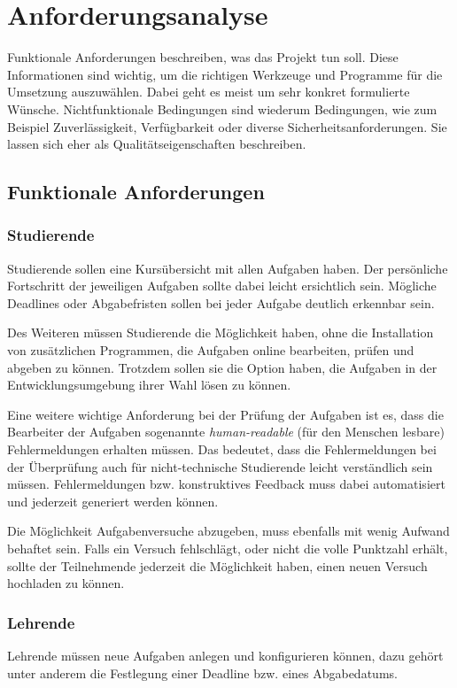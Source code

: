 \section{Anforderungsanalyse}\label{anforderungsanalyse}
Funktionale Anforderungen beschreiben, was das Projekt tun soll. Diese
Informationen sind wichtig, um die richtigen Werkzeuge und Programme für die
Umsetzung auszuwählen. Dabei geht es meist um sehr konkret formulierte Wünsche.
Nichtfunktionale Bedingungen sind wiederum Bedingungen, wie zum Beispiel
Zuverlässigkeit, Verfügbarkeit oder diverse Sicherheitsanforderungen. Sie lassen
sich eher als Qualitätseigenschaften beschreiben.

\subsection{Funktionale Anforderungen}\label{anforderungsanalyse-funktional}
\subsubsection{Studierende}\label{anforderungsanalyse-funktional-stud}
Studierende sollen eine Kursübersicht mit allen Aufgaben haben. Der persönliche
Fortschritt der jeweiligen Aufgaben sollte dabei leicht ersichtlich sein.
Mögliche Deadlines oder Abgabefristen sollen bei jeder Aufgabe deutlich
erkennbar sein.

Des Weiteren müssen Studierende die Möglichkeit haben, ohne die Installation von zusätzlichen Programmen, die Aufgaben online bearbeiten, prüfen und abgeben
zu können. Trotzdem sollen sie die Option haben, die Aufgaben in der
Entwicklungsumgebung ihrer Wahl lösen zu können.

Eine weitere wichtige Anforderung bei der Prüfung der Aufgaben ist es, dass
die Bearbeiter der Aufgaben sogenannte \emph{human-readable} (für den Menschen
lesbare) Fehlermeldungen erhalten müssen. Das bedeutet, dass die Fehlermeldungen
bei der Überprüfung auch für nicht-technische Studierende leicht verständlich
sein müssen. Fehlermeldungen bzw. konstruktives Feedback muss dabei
automatisiert und jederzeit generiert werden können.

Die Möglichkeit Aufgabenversuche abzugeben, muss ebenfalls mit wenig Aufwand
behaftet sein. Falls ein Versuch fehlschlägt, oder nicht die volle Punktzahl
erhält, sollte der Teilnehmende jederzeit die Möglichkeit haben, einen neuen
Versuch hochladen zu können.

\subsubsection{Lehrende}\label{anforderungsanalyse-funktional-lehrende}
Lehrende müssen neue Aufgaben anlegen und konfigurieren können, dazu gehört
unter anderem die Festlegung einer Deadline bzw. eines Abgabedatums.

